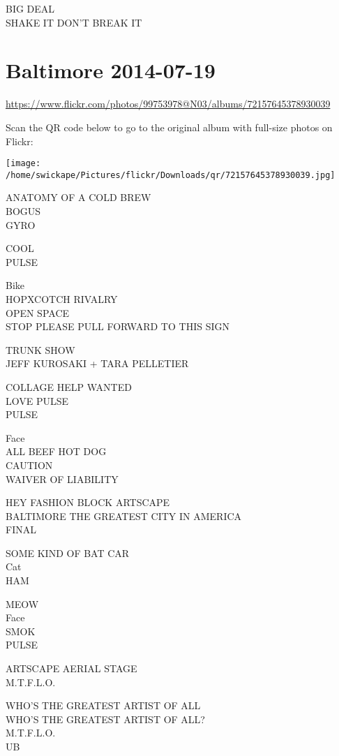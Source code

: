 \documentclass[10pt,letterpaper]{article}
\begin{document}
BIG DEAL\\
SHAKE IT DON'T BREAK IT
\pagebreak

\section*{Baltimore 2014-07-19}

\url{https://www.flickr.com/photos/99753978@N03/albums/72157645378930039}

Scan the QR code below to go to the original album with full-size photos on Flickr:

\texttt{[image: /home/swickape/Pictures/flickr/Downloads/qr/72157645378930039.jpg]}
\pagebreak

ANATOMY OF A COLD BREW\\
BOGUS\\
GYRO

COOL\\
PULSE

Bike\\
HOPXCOTCH RIVALRY\\
OPEN SPACE\\
STOP PLEASE PULL FORWARD TO THIS SIGN

TRUNK SHOW\\
JEFF KUROSAKI + TARA PELLETIER

COLLAGE HELP WANTED\\
LOVE PULSE\\
PULSE

Face\\
ALL BEEF HOT DOG\\
CAUTION\\
WAIVER OF LIABILITY

HEY FASHION BLOCK ARTSCAPE\\
BALTIMORE THE GREATEST CITY IN AMERICA\\
FINAL

SOME KIND OF BAT CAR\\
Cat\\
HAM

MEOW\\
Face\\
SMOK\\
PULSE

ARTSCAPE AERIAL STAGE\\
M.T.F.L.O.

WHO'S THE GREATEST ARTIST OF ALL\\
WHO'S THE GREATEST ARTIST OF ALL?\\
M.T.F.L.O.\\
UB
\end{document}
